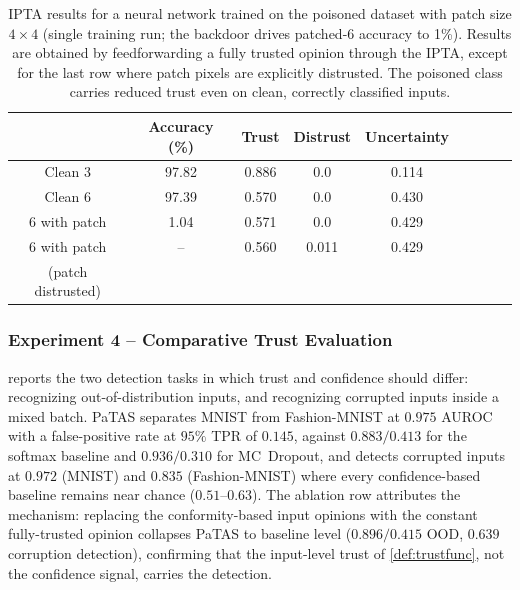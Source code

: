 \begin{table}[ht]
\centering
\begin{tabular}{ccccccccc}
\hline
 & Accuracy (\%) & Trust  & Distrust & Uncertainty \\
\hline
Clean 3 & 97.82 & 0.886 & 0.0 & 0.114\\

Clean 6  & 97.39 & 0.570 & 0.0 & 0.430\\

6 with patch& 1.04 & 0.571 & 0.0 & 0.429\\

6 with patch & -- & 0.560 & 0.011 & 0.429\\
(patch distrusted) &&&&\\
\hline
\end{tabular}
\caption{IPTA results for a neural network trained on the poisoned dataset with patch size $4\times 4$ (single training run; the backdoor drives patched-6 accuracy to 1\%). Results are obtained by feedforwarding a fully trusted opinion through the IPTA, except for the last row where patch pixels are explicitly distrusted. The poisoned class carries reduced trust even on clean, correctly classified inputs.}
\label{tab:mnistpoisipta}
\end{table}

\subsubsection*{Experiment 4 -- Comparative Trust Evaluation}
 reports the two detection tasks in which trust and confidence should differ: recognizing out-of-distribution inputs, and recognizing corrupted inputs inside a mixed batch. PaTAS separates MNIST from Fashion-MNIST at $0.975$ AUROC with a false-positive rate at $95\%$ TPR of $0.145$, against $0.883/0.413$ for the softmax baseline and $0.936/0.310$ for MC~Dropout, and detects corrupted inputs at $0.972$ (MNIST) and $0.835$ (Fashion-MNIST) where every confidence-based baseline remains near chance ($0.51$--$0.63$). The ablation row attributes the mechanism: replacing the conformity-based input opinions with the constant fully-trusted opinion collapses PaTAS to baseline level ($0.896/0.415$ OOD, $0.639$ corruption detection), confirming that the input-level trust of \cref{def:trustfunc}, not the confidence signal, carries the detection.

